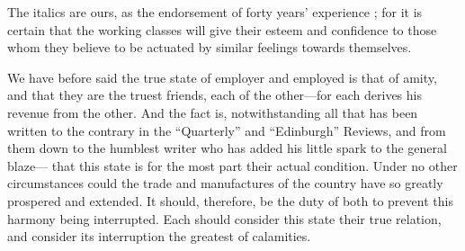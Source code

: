 The italics are ours, as the endorsement of forty years' experience ;
for it is certain that the working classes will give their esteem and
confidence to those whom they believe to be actuated by similar feelings
towards themselves.

We have before said the true state of employer and employed is that of
amity, and that they are the truest friends, each of the other---for
each derives his revenue from the other. And the fact is,
notwithstanding all that has been written to the contrary in the
``Quarterly'' and ``Edinburgh'' Reviews, and from them down to the
humblest writer who has added his little spark to the general blaze---
that this state is for the most part their actual condition. Under no
other circumstances could the trade and manufactures of the country have
so greatly prospered and extended. It should, therefore, be the duty of
both to prevent this harmony being interrupted. Each should consider
this state their true relation, and consider its interruption the
greatest of calamities.
